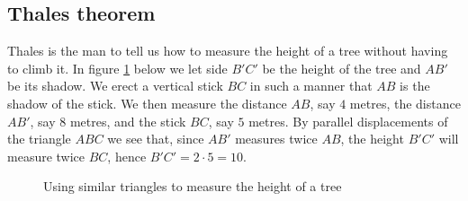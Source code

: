 \subsection{Thales theorem}
Thales is the man to tell us how to measure the height of a tree without having to climb it. In figure \ref{geo:thales} below we let side $B'C'$ be the height of the tree and $AB'$ be its shadow. We erect a vertical stick $BC$ in such a manner that $AB$ is the shadow of the stick. We then measure the distance $AB$, say $4$ metres, the distance $AB'$, say $8$ metres, and the stick $BC$, say $5$ metres. By parallel displacements of the triangle $ABC$ we see that, since $AB′$ measures twice $AB$, the height $B'C'$ will measure twice $BC$, hence $B'C' = 2 \cdot 5 = 10$.
\begin{figure}[H]
\label{geo:thales}
\centering
{}
\caption{Using similar triangles to measure the height of a tree}
\end{figure}

